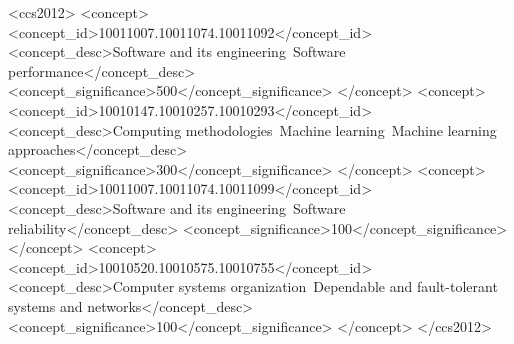 \documentclass[sigconf, review, anonymous, balance=false]{acmart}
\begin{document}
\begin{CCSXML}
<ccs2012>
   <concept>
       <concept_id>10011007.10011074.10011092</concept_id>
       <concept_desc>Software and its engineering~Software performance</concept_desc>
       <concept_significance>500</concept_significance>
   </concept>
   <concept>
       <concept_id>10010147.10010257.10010293</concept_id>
       <concept_desc>Computing methodologies~Machine learning~Machine learning approaches</concept_desc>
       <concept_significance>300</concept_significance>
   </concept>
   <concept>
       <concept_id>10011007.10011074.10011099</concept_id>
       <concept_desc>Software and its engineering~Software reliability</concept_desc>
       <concept_significance>100</concept_significance>
   </concept>
   <concept>
       <concept_id>10010520.10010575.10010755</concept_id>
       <concept_desc>Computer systems organization~Dependable and fault-tolerant systems and networks</concept_desc>
       <concept_significance>100</concept_significance>
   </concept>
</ccs2012>
\end{CCSXML}






\maketitle
\end{document}
